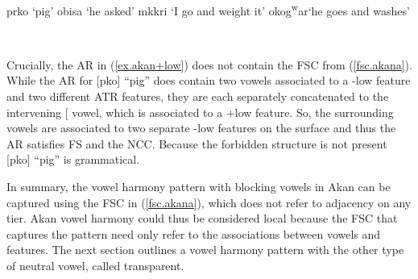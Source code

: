 \documentclass[,doc,floatsintext]{apa6}
\theoremstyle{definition}
\theoremstyle{definition}
\theoremstyle{definition}
\theoremstyle{remark}
\begin{document}
\begin{exe}
  \label{akan_+low}
  \begin{xlist}
    \ex prko  `pig'
    \ex obisa `he asked'
    \ex mkkri  `I go and weight it'
    \ex okog\textsuperscript{w}ar\textraiseglotstop `he goes and washes'
  \end{xlist}
\end{exe}

\begin{exe}
\label{ex.akan+low} \\
\end{exe}

\noindent Crucially, the AR in (\ref{ex.akan+low}) does not contain the
FSC from (\ref{fsc.akana}). While the AR for {[}pko{]}
\enquote{pig} does contain two vowels associated to a -low feature and
two different ATR features, they are each separately concatenated to the
intervening {[}\textipa{3}{]} vowel, which is associated to a +low
feature. So, the surrounding vowels are associated to two separate -low
features on the surface and thus the AR satisfies FS and the NCC.
Because the forbidden structure is not present {[}pko{]}
\enquote{pig} is grammatical.

In summary, the vowel harmony pattern with blocking vowels in Akan can
be captured using the FSC in (\ref{fsc.akana}), which does not refer to
adjacency on any tier. Akan vowel harmony could thus be considered local
because the FSC that captures the pattern need only refer to the
associations between vowels and features. The next section outlines a
vowel harmony pattern with the other type of neutral vowel, called
transparent.
\end{document}
